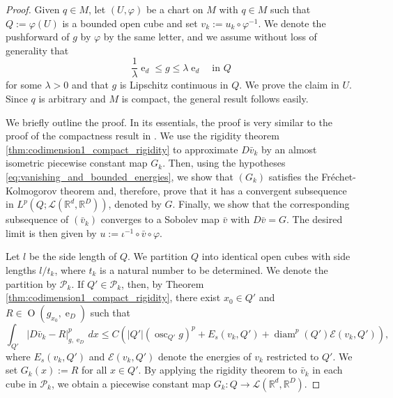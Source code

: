 \documentclass{article}
\numberwithin{equation}{section}
\theoremstyle{definition}
\theoremstyle{remark}
\DeclareMathOperator{\diam}{diam}
\DeclareMathOperator{\e}{e}
\DeclareMathOperator{\Ort}{O}
\DeclareMathOperator*{\osc}{osc}
\begin{document}
\begin{proof}
    Given $q \in M$, let $(U, \varphi)$ be a chart on $M$ with $q \in M$ such that $Q := \varphi(U)$ is a bounded open cube and set $v_k := u_k \circ \varphi^{-1}$. We denote the pushforward of $g$ by $\varphi$ by the same letter, and we assume without loss of generality that
    \[
    \frac{1}{\lambda} \e_d \le g \le \lambda \e_d \quad \text{in } Q
    \]
    for some $\lambda > 0$ and that $g$ is Lipschitz continuous in $Q$. We prove the claim in $U$. Since $q$ is arbitrary and $M$ is compact, the general result follows easily.

    We briefly outline the proof. In its essentials, the proof is very similar to the proof of the compactness result in \cite[Theorem 4.1]{FJM}. We use the rigidity theorem \ref{thm:codimension1_compact_rigidity} to approximate $D\bar{v}_k$ by an almost isometric piecewise constant map $G_k$. Then, using the hypotheses \eqref{eq:vanishing_and_bounded_energies}, we show that $(G_k)$ satisfies the Fréchet-Kolmogorov theorem and, therefore, prove that it has a convergent subsequence in $L^p(Q; \mathcal{L}(\mathbb{R}^d, \mathbb{R}^D))$, denoted by $G$. Finally, we show that the corresponding subsequence of $(\bar{v}_k)$ converges to a Sobolev map $\bar{v}$ with $D\bar{v} = G$. The desired limit is then given by $u := \iota^{-1} \circ \bar{v} \circ \varphi$.

    Let $l$ be the side length of $Q$. We partition $Q$ into identical open cubes with side lengths $l/t_k$, where $t_k$ is a natural number to be determined. We denote the partition by $\mathcal{P}_k$. If $Q' \in \mathcal{P}_k$, then, by Theorem \ref{thm:codimension1_compact_rigidity}, there exist $x_0 \in Q'$ and $R \in \Ort(g_{x_0}, \e_D)$ such that
    \begin{equation} \label{eq:piecewise_approximation}
        \int_{Q'} |D\bar{v}_k - R|_{g, \e_D}^p \, dx \le C \left(|Q'| \left(\osc_{Q'} g\right)^p + E_s(v_k, Q') + \diam^p(Q') \mathcal{E}(v_k, Q')\right),
    \end{equation}
    where $E_s(v_k, Q')$ and $\mathcal{E}(v_k, Q')$ denote the energies of $v_k$ restricted to $Q'$. We set $G_k(x) := R$ for all $x \in Q'$. By applying the rigidity theorem to $\bar{v}_k$ in each cube in $\mathcal{P}_k$, we obtain a piecewise constant map $G_k : Q \rightarrow \mathcal{L}(\mathbb{R}^d, \mathbb{R}^D)$.
    

\end{proof}
\end{document}
